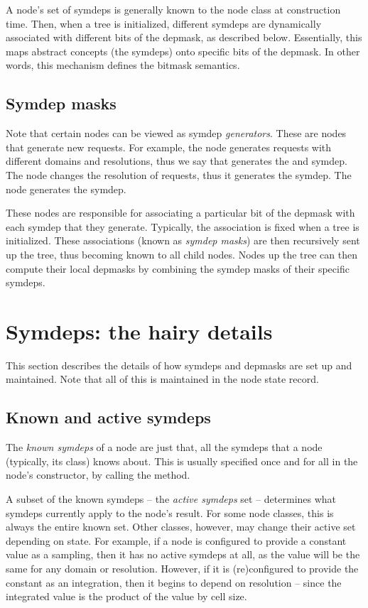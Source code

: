   A node's set of symdeps is generally known to the node class at construction
  time. Then, when a tree is initialized, different symdeps are dynamically
  associated with different bits of the depmask, as described below.
  Essentially, this maps abstract concepts (the symdeps) onto specific bits of
  the depmask. In other words, this mechanism defines the bitmask semantics.

\subsection{Symdep masks}

  Note that certain nodes can be viewed as symdep {\em generators}. These are
  nodes that generate new requests. For example, the  node generates
  requests with different domains and resolutions, thus we say that 
  generates the  and  symdep. The 
  node changes the resolution of requests, thus it generates the
   symdep. The  node generates the
   symdep.

  These nodes are responsible for associating a particular bit of the depmask
  with each symdep that they generate. Typically, the association is fixed when
  a tree is initialized. These associations (known as {\em symdep masks}) are
  then recursively sent up the tree, thus becoming known to all child nodes.
  Nodes up the tree can then compute their local depmasks by combining the
  symdep masks of their specific symdeps.

\section{Symdeps: the hairy details}

  This section describes the details of how symdeps and depmasks are set up and
  maintained. Note that all of this is maintained in the node state record.

\subsection{Known and active symdeps} 
  
  The {\em known symdeps} of a node are just that, all the symdeps that a node
  (typically, its class) knows about. This is usually specified once and for
  all in the node's constructor, by calling the  method. 

  A subset of the known symdeps -- the {\em active symdeps} set -- determines
  what symdeps currently apply to the node's result. For some node classes,
  this is always the entire known set. Other classes, however, may change their
  active set depending on state. For example, if a  node is
  configured to provide a constant value as a sampling, then it has no active
  symdeps at all, as the value will be the same for any domain or resolution.
  However, if it is (re)configured to provide the constant as an integration,
  then it begins to depend on resolution -- since the integrated value is the
  product of the value by cell size.


